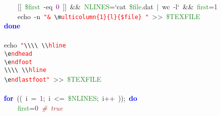 \mbox{}\ \ \ \ \ \ \ \ \textcolor{BrickRed}{[[}\ \textcolor{ForestGreen}{\$first}\ -eq\ \textcolor{Purple}{0}\ \textcolor{BrickRed}{]]}\ \textcolor{BrickRed}{\&\&}\ \textcolor{ForestGreen}{NLINES}\textcolor{BrickRed}{=}`cat\ \textcolor{ForestGreen}{\$file}\textcolor{BrickRed}{.}dat\ \textcolor{BrickRed}{$|$}\ wc\ -l`\ \textcolor{BrickRed}{\&\&}\ \textcolor{ForestGreen}{first}\textcolor{BrickRed}{=}\textcolor{Purple}{1} \\
\mbox{}\ \ \ \ \ \ \ \ echo\ -n\ \texttt{\textcolor{Red}{"{}\&\ }}\texttt{\textcolor{CarnationPink}{\textbackslash{}m}}\texttt{\textcolor{Red}{ulticolumn\{1\}\{l\}\{\$file\}\ "{}}}\ \textcolor{BrickRed}{\textgreater{}\textgreater{}}\ \textcolor{ForestGreen}{\$TEXFILE} \\
\mbox{}\ \ \ \ \textbf{\textcolor{Blue}{done}} \\
\mbox{} \\
\mbox{}\ \ \ \ echo\ \texttt{\textcolor{Red}{"{}}}\texttt{\textcolor{CarnationPink}{\textbackslash{}\textbackslash{}\textbackslash{}\textbackslash{}}}\texttt{\textcolor{Red}{\ }}\texttt{\textcolor{CarnationPink}{\textbackslash{}\textbackslash{}}}\texttt{\textcolor{Red}{hline}} \\
\mbox{}\texttt{\textcolor{Red}{\ \ \ \ }}\texttt{\textcolor{CarnationPink}{\textbackslash{}e}}\texttt{\textcolor{Red}{ndhead}} \\
\mbox{}\texttt{\textcolor{Red}{\ \ \ \ }}\texttt{\textcolor{CarnationPink}{\textbackslash{}e}}\texttt{\textcolor{Red}{ndfoot}} \\
\mbox{}\texttt{\textcolor{Red}{\ \ \ \ }}\texttt{\textcolor{CarnationPink}{\textbackslash{}\textbackslash{}\textbackslash{}\textbackslash{}}}\texttt{\textcolor{Red}{\ }}\texttt{\textcolor{CarnationPink}{\textbackslash{}\textbackslash{}}}\texttt{\textcolor{Red}{hline}} \\
\mbox{}\texttt{\textcolor{Red}{\ \ \ \ }}\texttt{\textcolor{CarnationPink}{\textbackslash{}e}}\texttt{\textcolor{Red}{ndlastfoot"{}}}\ \textcolor{BrickRed}{\textgreater{}\textgreater{}}\ \textcolor{ForestGreen}{\$TEXFILE} \\
\mbox{} \\
\mbox{}\ \ \ \ \textbf{\textcolor{Blue}{for}}\ \textcolor{BrickRed}{((}\ i\ \textcolor{BrickRed}{=}\ \textcolor{Purple}{1}\textcolor{BrickRed}{;}\ i\ \textcolor{BrickRed}{\textless{}=}\ \textcolor{ForestGreen}{\$NLINES}\textcolor{BrickRed}{;}\ i\textcolor{BrickRed}{++}\ \textcolor{BrickRed}{));}\ \textbf{\textcolor{Blue}{do}} \\
\mbox{}\ \ \ \ \ \ \ \ \textcolor{ForestGreen}{first}\textcolor{BrickRed}{=}\textcolor{Purple}{0}\ \textit{\textcolor{Brown}{\#\ true}} \\
